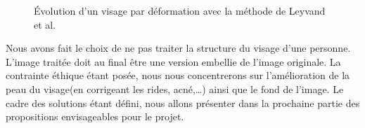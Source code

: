 \documentclass[11pt, french,screen]{report-rd-info}
\begin{document}
\begin{figure}[htp]
 \centering
 \caption{Évolution d’un visage par déformation avec la méthode de Leyvand et al.\cite{Leyvand2008}}
 \label{fig:VisagesData}
\end{figure}

Nous avons fait le choix de ne pas traiter la structure du visage d’une personne. L’image traitée doit au final être une version embellie de l’image originale. La contrainte éthique étant posée,  nous nous concentrerons sur l’amélioration de la peau du visage(en corrigeant les rides, acné,\ldots) ainsi que le fond de l’image.
Le cadre des solutions étant défini, nous allons présenter dans la prochaine partie des propositions envisageables pour le projet.
\end{document}
